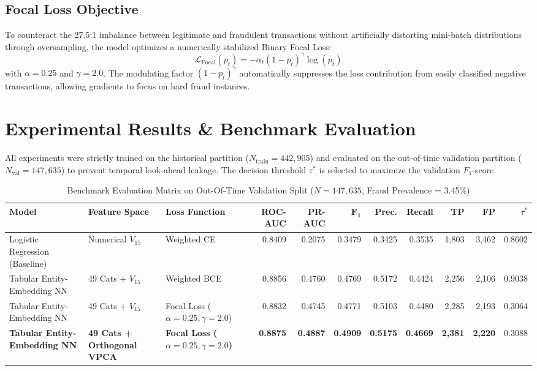 \documentclass[conference]{IEEEtran}
\begin{document}
\subsection{Focal Loss Objective}
To counteract the 27.5:1 imbalance between legitimate and fraudulent transactions without artificially distorting mini-batch distributions through oversampling, the model optimizes a numerically stabilized Binary Focal Loss:
\begin{equation}
\mathcal{L}_{\text{Focal}}(p_t) = -\alpha_t (1 - p_t)^\gamma \log(p_t)
\end{equation}
with $\alpha = 0.25$ and $\gamma = 2.0$. The modulating factor $(1 - p_t)^\gamma$ automatically suppresses the loss contribution from easily classified negative transactions, allowing gradients to focus on hard fraud instances.

\section{Experimental Results \& Benchmark Evaluation}
All experiments were strictly trained on the historical partition ($N_{\text{train}}=442,905$) and evaluated on the out-of-time validation partition ($N_{\text{val}}=147,635$) to prevent temporal look-ahead leakage. The decision threshold $\tau^*$ is selected to maximize the validation $F_1$-score.

\begin{table}[t]
\caption{Benchmark Evaluation Matrix on Out-Of-Time Validation Split ($N=147,635$, Fraud Prevalence = 3.45\%)}
\label{tab:benchmark_results}
\centering
\small
\begin{tabular}{lllrrrrrrrr}
\toprule
\textbf{Model} & \textbf{Feature Space} & \textbf{Loss Function} & \textbf{ROC-AUC} & \textbf{PR-AUC} & $\mathbf{F_1}$ & \textbf{Prec.} & \textbf{Recall} & \textbf{TP} & \textbf{FP} & $\tau^*$ \\
\midrule
Logistic Regression (Baseline) & Numerical $V_{15}$ & Weighted CE & 0.8409 & 0.2075 & 0.3479 & 0.3425 & 0.3535 & 1,803 & 3,462 & 0.8602 \\
Tabular Entity-Embedding NN & 49 Cats + $V_{15}$ & Weighted BCE & 0.8856 & 0.4760 & 0.4769 & 0.5172 & 0.4424 & 2,256 & 2,106 & 0.9038 \\
Tabular Entity-Embedding NN & 49 Cats + $V_{15}$ & Focal Loss ($\alpha=0.25, \gamma=2.0$) & 0.8832 & 0.4745 & 0.4771 & 0.5103 & 0.4480 & 2,285 & 2,193 & 0.3064 \\
\textbf{Tabular Entity-Embedding NN} & \textbf{49 Cats + Orthogonal VPCA} & \textbf{Focal Loss ($\alpha=0.25, \gamma=2.0$)} & \textbf{0.8875} & \textbf{0.4887} & \textbf{0.4909} & \textbf{0.5175} & \textbf{0.4669} & \textbf{2,381} & \textbf{2,220} & 0.3088 \\
\bottomrule
\end{tabular}
\end{table}
\end{document}
